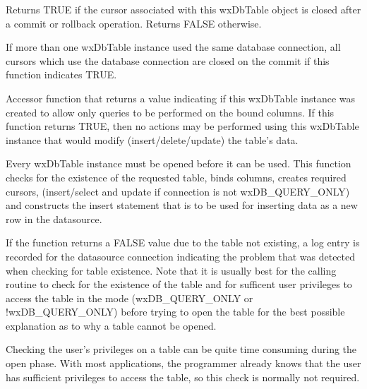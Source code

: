 Returns TRUE if the cursor associated with this wxDbTable object is closed 
after a commit or rollback operation.  Returns FALSE otherwise.


If more than one wxDbTable instance used the same database connection, all cursors 
which use the database connection are closed on the commit if this function 
indicates TRUE.


\label{wxdbtableisqueryonly}


Accessor function that returns a value indicating if this wxDbTable instance 
was created to allow only queries to be performed on the bound columns.  If 
this function returns TRUE, then no actions may be performed using this 
wxDbTable instance that would modify (insert/delete/update) the table's data.


\label{wxdbtableopen}


Every wxDbTable instance must be opened before it can be used.  This function 
checks for the existence of the requested table, binds columns, creates required 
cursors, (insert/select and update if connection is not wxDB_QUERY_ONLY) and 
constructs the insert statement that is to be used for inserting data as a new 
row in the datasource.




If the function returns a FALSE value due to the table not existing, a log 
entry is recorded for the datasource connection indicating the problem 
that was detected when checking for table existence.  Note that it is usually 
best for the calling routine to check for the existence of the table and for 
sufficent user privileges to access the table in the mode (wxDB_QUERY_ONLY or 
!wxDB_QUERY_ONLY) before trying to open the table for the best possible 
explanation as to why a table cannot be opened.

Checking the user's privileges on a table can be quite time consuming during 
the open phase.  With most applications, the programmer already knows that the 
user has sufficient privileges to access the table, so this check is normally 
not required.


